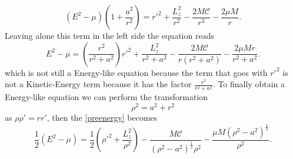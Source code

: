 \begin{Proof}
\begin{equation}
 \left( E^2-\mu  \right) \left( 1+\frac{a^2}{r^2} \right)= r'^2+\frac{L_z^2}{r^2}-\frac{2 M \mathcal{C}}{r^3}-\frac{2 \mu  M}{r}.
\end{equation}
Leaving alone this term in the left side the equation reads
\begin{equation}
 E^2-\mu =\left(\frac{r^2}{r^2+a^2} \right) r'^2 +\frac{L_z^2}{r^2+a^2}-\frac{2 M \mathcal{C}}{r(r^2+a^2)}-\frac{2 \mu  M r}{r^2+a^2}.
\end{equation}\label{preenergy}
which is not still a Energy-like equation because the term that goes with $ r'^2 $ is not a Kinetic-Energy term because it has the factor $\frac{r^2}{r^2+a^2} $. To finally obtain a Energy-like equation we can perform the transformation
\begin{equation}
 \rho^2=a^2+r^2
\end{equation}
as $\rho \rho ' = r r'$, then the \cref{preenergy} becomes
\begin{equation}
 \frac{1}{2} \left( E^2-\mu \right) = \frac{1}{2} \left( \rho'^2 +\frac{L_z^2}{\rho^2}\right)-\frac{ M \mathcal{C}}{(\rho^2-a^2)^\frac{1}{2} \rho^2}-\frac{ \mu  M (\rho^2-a^2)^\frac{1}{2}}{\rho^2}.
\end{equation}
\end{Proof}


